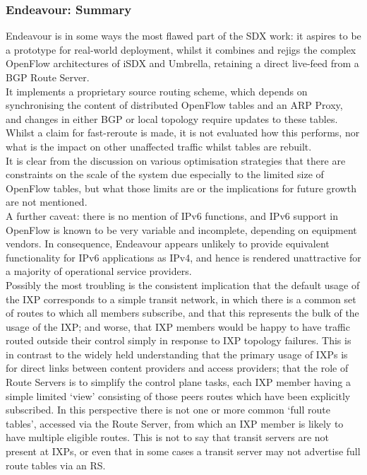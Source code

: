 \subsubsection{Endeavour: Summary}
Endeavour is in some ways the most flawed part of the SDX work: it aspires to be a prototype for real-world deployment, whilst it combines and rejigs the complex OpenFlow architectures of iSDX and Umbrella, retaining a direct live-feed from a BGP Route Server.
\\
It implements a proprietary source routing scheme, which depends on synchronising the content of distributed OpenFlow tables and an ARP Proxy, and changes in either BGP or local topology require updates to these tables.
\\
Whilst a claim for fast-reroute is made, it is not evaluated how this performs, nor what is the impact on other unaffected traffic whilst tables are rebuilt.
\\
It is clear from the discussion on various optimisation strategies that there are constraints on the scale of the system due especially to the limited size of OpenFlow tables, but what those limits are or the implications for future growth are not mentioned.
\\
A further caveat: there is no mention of IPv6 functions, and IPv6 support in OpenFlow is known to be very variable and incomplete, depending on equipment vendors.
In consequence, Endeavour appears unlikely to provide equivalent functionality for IPv6 applications as IPv4, and hence is rendered unattractive for a majority of operational service providers.
\\
Possibly the most troubling is the consistent implication that the default usage of the IXP corresponds to a simple transit network, in which there is a common set of routes to which all members subscribe, and that this represents the bulk of the usage of the IXP; and worse, that IXP members would be happy to have traffic routed outside their control simply in response to IXP topology failures.
This is in contrast to the widely held understanding that the primary usage of IXPs is for direct links between content providers and access providers; that the role of Route Servers is to simplify the control plane tasks, each IXP member having a simple limited `view' consisting of those peers routes which have been explicitly subscribed.
In this perspective there is not one or more common `full route tables', accessed via the Route Server, from which an IXP member is likely to have multiple eligible routes.
This is not to say that transit servers are not present at IXPs, or even that in some cases a transit server may not advertise full route tables via an RS.
